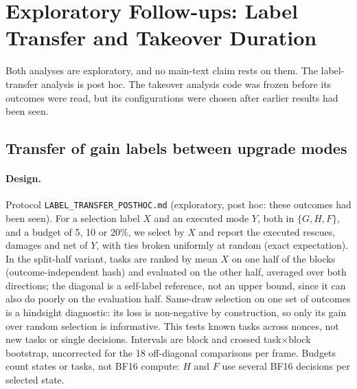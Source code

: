\section{Exploratory Follow-ups: Label Transfer and Takeover Duration}
\label{app:followups}

Both analyses are exploratory, and no main-text claim rests on them. The label-transfer analysis is post hoc. The takeover analysis code was frozen before its outcomes were read, but its configurations were chosen after earlier results had been seen.

\subsection{Transfer of gain labels between upgrade modes}
\label{app:transfer}

\paragraph{Design.} Protocol \texttt{LABEL\_TRANSFER\_POSTHOC.md} (exploratory, post hoc: these outcomes had been seen). For a selection label $X$ and an executed mode $Y$, both in $\{G,H,F\}$, and a budget of 5, 10 or 20\%, we select by $X$ and report the executed rescues, damages and net of $Y$, with ties broken uniformly at random (exact expectation). In the split-half variant, tasks are ranked by mean $X$ on one half of the blocks (outcome-independent hash) and evaluated on the other half, averaged over both directions; the diagonal is a self-label reference, not an upper bound, since it can also do poorly on the evaluation half. Same-draw selection on one set of outcomes is a hindsight diagnostic: its loss is non-negative by construction, so only its gain over random selection is informative. This tests known tasks across nonces, not new tasks or single decisions. Intervals are block and crossed task$\times$block bootstrap, uncorrected for the 18 off-diagonal comparisons per frame. Budgets count states or tasks, not BF16 compute: $H$ and $F$ use several BF16 decisions per selected state. %
